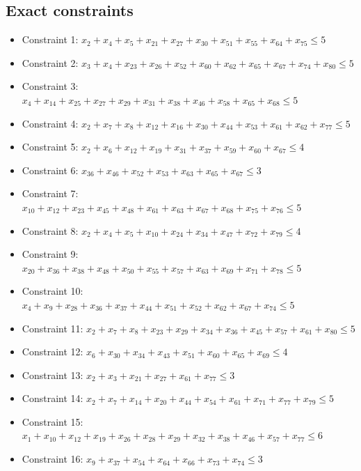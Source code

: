\documentclass[11pt]{article}
\begin{document}
\subsection*{Exact constraints}
\begin{itemize}
\item Constraint 1: $x_{2} + x_{4} + x_{5} + x_{21} + x_{27} + x_{30} + x_{51} + x_{55} + x_{64} + x_{75} \le 5$
\item Constraint 2: $x_{3} + x_{4} + x_{23} + x_{26} + x_{52} + x_{60} + x_{62} + x_{65} + x_{67} + x_{74} + x_{80} \le 5$
\item Constraint 3: $x_{4} + x_{14} + x_{25} + x_{27} + x_{29} + x_{31} + x_{38} + x_{46} + x_{58} + x_{65} + x_{68} \le 5$
\item Constraint 4: $x_{2} + x_{7} + x_{8} + x_{12} + x_{16} + x_{30} + x_{44} + x_{53} + x_{61} + x_{62} + x_{77} \le 5$
\item Constraint 5: $x_{2} + x_{6} + x_{12} + x_{19} + x_{31} + x_{37} + x_{59} + x_{60} + x_{67} \le 4$
\item Constraint 6: $x_{36} + x_{46} + x_{52} + x_{53} + x_{63} + x_{65} + x_{67} \le 3$
\item Constraint 7: $x_{10} + x_{12} + x_{23} + x_{45} + x_{48} + x_{61} + x_{63} + x_{67} + x_{68} + x_{75} + x_{76} \le 5$
\item Constraint 8: $x_{2} + x_{4} + x_{5} + x_{10} + x_{24} + x_{34} + x_{47} + x_{72} + x_{79} \le 4$
\item Constraint 9: $x_{20} + x_{36} + x_{38} + x_{48} + x_{50} + x_{55} + x_{57} + x_{63} + x_{69} + x_{71} + x_{78} \le 5$
\item Constraint 10: $x_{4} + x_{9} + x_{28} + x_{36} + x_{37} + x_{44} + x_{51} + x_{52} + x_{62} + x_{67} + x_{74} \le 5$
\item Constraint 11: $x_{2} + x_{7} + x_{8} + x_{23} + x_{29} + x_{34} + x_{36} + x_{45} + x_{57} + x_{61} + x_{80} \le 5$
\item Constraint 12: $x_{6} + x_{30} + x_{34} + x_{43} + x_{51} + x_{60} + x_{65} + x_{69} \le 4$
\item Constraint 13: $x_{2} + x_{3} + x_{21} + x_{27} + x_{61} + x_{77} \le 3$
\item Constraint 14: $x_{2} + x_{7} + x_{14} + x_{20} + x_{44} + x_{54} + x_{61} + x_{71} + x_{77} + x_{79} \le 5$
\item Constraint 15: $x_{1} + x_{10} + x_{12} + x_{19} + x_{26} + x_{28} + x_{29} + x_{32} + x_{38} + x_{46} + x_{57} + x_{77} \le 6$
\item Constraint 16: $x_{9} + x_{37} + x_{54} + x_{64} + x_{66} + x_{73} + x_{74} \le 3$

\end{itemize}
\end{document}
